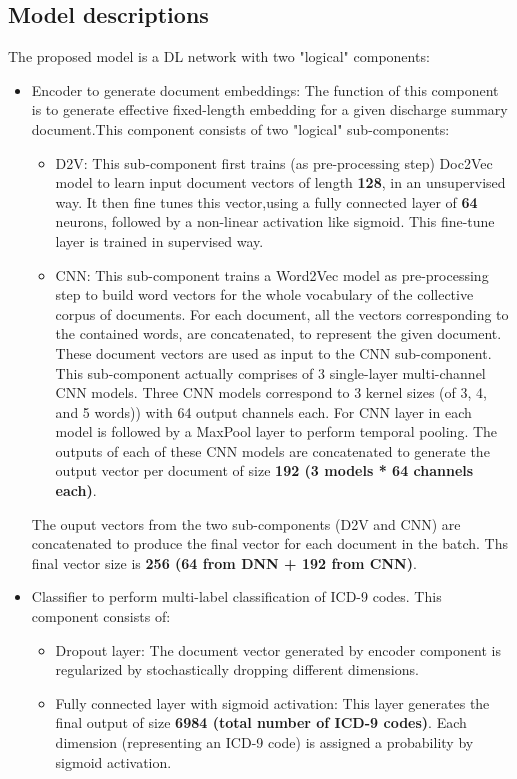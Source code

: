 \documentclass[11pt,a4paper]{article}
\begin{document}
\subsection{Model descriptions}
The proposed model is a DL network with two "logical" components:
\begin{itemize}
    \item Encoder to generate document embeddings: The function of this component is to generate effective fixed-length embedding for a given discharge summary document.This component consists of two "logical" sub-components:
    \begin{itemize}
    		\item D2V: This sub-component first trains (as pre-processing step) Doc2Vec model to learn input document vectors of length \textbf{128}, in an unsupervised way. It then fine tunes this vector,using a fully connected layer of \textbf{64} neurons, followed by a non-linear activation like sigmoid. This fine-tune layer is trained in supervised way.
    		\item CNN: This sub-component trains a Word2Vec model as pre-processing step to build word vectors for the whole vocabulary of the collective corpus of documents. For each document, all the vectors corresponding to the contained words, are concatenated, to represent the given document. These document vectors are used as input to the CNN sub-component. This sub-component actually comprises of 3 single-layer multi-channel CNN models. Three CNN models correspond to 3 kernel sizes (of 3, 4, and 5 words)) with 64 output channels each. For CNN layer in each model is followed by a MaxPool layer to perform temporal pooling. The outputs of each of these CNN models are concatenated to generate the output vector per document of size \textbf{192 (3 models * 64 channels each)}.
    \end{itemize}
The ouput vectors from the two sub-components (D2V and CNN) are concatenated to produce the final vector for each document in the batch. Ths final vector size is \textbf{256 (64 from DNN + 192 from CNN)}.

	\item Classifier to perform multi-label classification of ICD-9 codes. This component consists of:
	 \begin{itemize}
	 	\item Dropout layer: The document vector generated by encoder component is regularized by stochastically dropping different dimensions.
	 	\item Fully connected layer with sigmoid activation: This layer generates the final output of size \textbf{6984 (total number of ICD-9 codes)}. Each dimension (representing an ICD-9 code) is assigned a probability by sigmoid activation.
	 \end{itemize}
\end{itemize}
\end{document}

